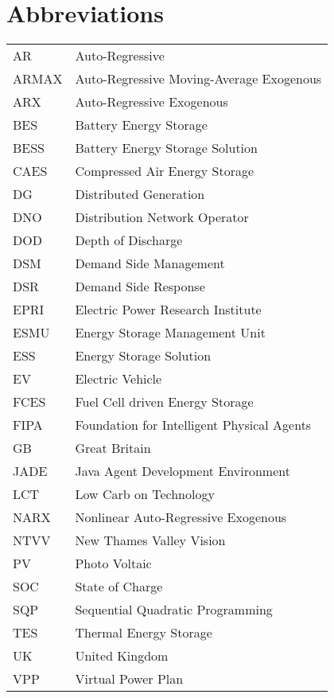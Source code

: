 \chapter*{Abbreviations}


\begin{table*}[hbt]
  \begin{tabular}{l l}
    AR & Auto-Regressive\\
    ARMAX & Auto-Regressive Moving-Average Exogenous\\
    ARX & Auto-Regressive Exogenous\\
    BES & Battery Energy Storage\\
    BESS & Battery Energy Storage Solution\\
    CAES & Compressed Air Energy Storage\\
    DG & Distributed Generation\\
    DNO & Distribution Network Operator\\
    DOD & Depth of Discharge\\
    DSM & Demand Side Management\\
    DSR & Demand Side Response\\
    EPRI & Electric Power Research Institute\\
    ESMU & Energy Storage Management Unit\\
    ESS & Energy Storage Solution\\
    EV & Electric Vehicle\\
    FCES & Fuel Cell driven Energy Storage\\
    FIPA & Foundation for Intelligent Physical Agents\\
    GB & Great Britain\\
    JADE & Java Agent Development Environment\\
    LCT & Low Carb on Technology\\
    NARX & Nonlinear Auto-Regressive Exogenous\\
    NTVV & New Thames Valley Vision\\
    PV & Photo Voltaic\\
    SOC & State of Charge\\
    SQP & Sequential Quadratic Programming\\
    TES & Thermal Energy Storage\\
    UK & United Kingdom\\
    VPP & Virtual Power Plan
  \end{tabular}
\end{table*}
